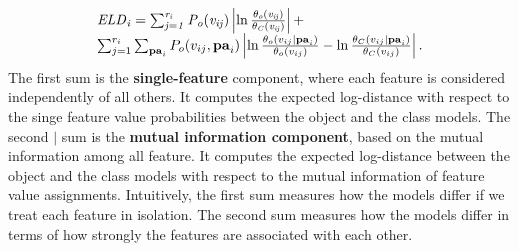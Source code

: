 \documentclass[conference]{IEEEtran}
\begin{document}
\begin{equation} \label{eq:log-dist}
\begin{array}{l}
		\mid_{i} =\sum_{j=1}^{\states_{i}} P_{\object}(\nodevalue_{ij}) \left|\ln \frac{\parameter_{\object}( \nodevalue_{ij})}{\parameter_{\Class}( \nodevalue_{ij})}\right|+\\
		\sum_{j=1}^{\states_{i}} \sum_{\parents_{i}} 
		P_{\object}( \nodevalue_{ij},\parents_{i})
		\left|\ln \frac{\parameter_{\object}( \nodevalue_{ij}|\parents_{i})}{\parameter_{\object}(\nodevalue_{ij})} - \ln \frac{\parameter_{\Class}( \nodevalue_{ij}|\parents_{i})}{\parameter_{\Class}(\nodevalue_{ij})}\right|. \end{array}
		\end{equation}
%
The first sum is the \textbf{single-feature} component, where each feature is considered independently of all others. It computes the expected log-distance with respect to  the singe feature value probabilities between the object and the class models. 
%
The second $\mid$ sum is the \textbf{mutual information component}, based on the mutual information among all feature. It computes the expected log-distance between the object and the class models with respect to the mutual information of feature value assignments.
Intuitively, the first sum measures how the models differ if we treat each feature in isolation. The second sum measures how the models differ in terms of how strongly the features are associated with each other. 
\end{document}
